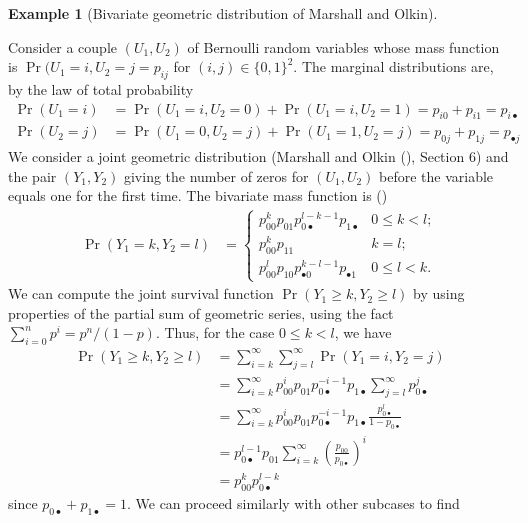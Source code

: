 \documentclass[
  11pt,
  letterpaper,
]{scrbook}
\theoremstyle{definition}
\theoremstyle{definition}
\newtheorem{example}{Example}[chapter]
\theoremstyle{definition}
\theoremstyle{plain}
\theoremstyle{plain}
\theoremstyle{remark}
\begin{document}
\begin{example}[Bivariate geometric distribution of Marshall and
Olkin]\protect\hypertarget{exm-biv-geometric}{}\label{exm-biv-geometric}

Consider a couple \((U_1, U_2)\) of Bernoulli random variables whose
mass function is \(\Pr(U_1=i, U_2=j=p_{ij}\) for
\((i,j) \in \{0,1\}^2\). The marginal distributions are, by the law of
total probability \begin{align*}
\Pr(U_1=i) &= \Pr(U_1=i, U_2=0) + \Pr(U_1=i, U_2=1) = p_{i0} + p_{i1} = p_{i\bullet}\\
\Pr(U_2=j) &= \Pr(U_1=0, U_2=j) + \Pr(U_1=1, U_2=j) = p_{0j} + p_{1j} = p_{\bullet j}
\end{align*} We consider a joint geometric distribution (Marshall and
Olkin (), Section 6) and the
pair \((Y_1, Y_2)\) giving the number of zeros for \((U_1, U_2)\) before
the variable equals one for the first time. The bivariate mass function
is () \begin{align*}
\Pr(Y_1 = k, Y_2 = l) &= 
\begin{cases}
p_{00}^kp_{01}p_{0 \bullet}^{l-k-1}p_{1 \bullet} & 0 \leq k < l; \\
p_{00}^kp_{11} & k=l; \\
p_{00}^lp_{10}p_{\bullet 0}^{k-l-1}p_{\bullet 1} & 0 \leq l < k.
\end{cases}
\end{align*} We can compute the joint survival function
\(\Pr(Y_1 \ge k, Y_2 \ge l)\) by using properties of the partial sum of
geometric series, using the fact \(\sum_{i=0}^n p^i = p^n/(1-p)\). Thus,
for the case \(0\leq k < l\), we have \begin{align*}
\Pr(Y_1 \ge k, Y_2 \ge l) &= \sum_{i=k}^\infty \sum_{j=l}^\infty \Pr(Y_1 = i, Y_2 = j)\\
&= \sum_{i=k}^\infty p_{00}^ip_{01}p_{0 \bullet}^{-i-1}p_{1 \bullet} \sum_{j=l}^\infty p_{0 \bullet}^{j}
\\&=\sum_{i=k}^\infty p_{00}^ip_{01}p_{0 \bullet}^{-i-1}p_{1 \bullet} \frac{p_{0 \bullet}^{l}}{1-p_{0\bullet}} \\&= p_{0 \bullet}^{l-1}p_{01} \sum_{i=k}^\infty \left(\frac{p_{00}}{p_{0 \bullet}}\right)^{i}
\\& = p_{00}^k p_{0 \bullet}^{l-k}
\end{align*} since \(p_{0\bullet} + p_{1\bullet} = 1\). We can proceed
similarly with other subcases to find \begin{align*}

\end{align*}
\end{example}
\end{document}
